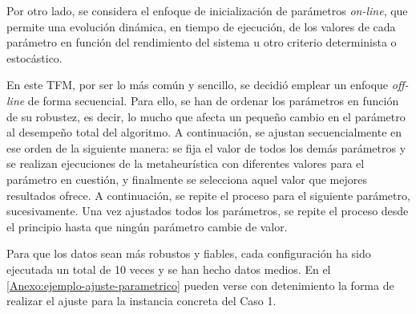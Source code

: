
Por otro lado, se considera el enfoque de inicialización de parámetros \textit{on-line}, que permite una evolución dinámica, en tiempo de ejecución, de los valores de cada parámetro en función del rendimiento del sistema u otro criterio determinista o estocástico.

En este TFM, por ser lo más común y sencillo, se decidió emplear un enfoque \textit{off-line} de forma secuencial. Para ello, se han de ordenar los parámetros en función de su robustez, es decir, lo mucho que afecta un pequeño cambio en el parámetro al desempeño total del algoritmo. A continuación, se ajustan secuencialmente en ese orden de la siguiente manera: se fija el valor de todos los demás parámetros y se realizan ejecuciones de la metaheurística con diferentes valores para el parámetro en cuestión, y finalmente se selecciona aquel valor que mejores resultados ofrece. A continuación, se repite el proceso para el siguiente parámetro, sucesivamente.
Una vez ajustados todos los parámetros, se repite el proceso desde el principio hasta que ningún parámetro cambie de valor.

Para que los datos sean más robustos y fiables, cada configuración ha sido ejecutada un total de 10 veces y se han hecho datos medios. En el \autoref{Anexo:ejemplo-ajuste-parametrico} pueden verse con detenimiento la forma de realizar el ajuste para la instancia concreta del Caso 1.


